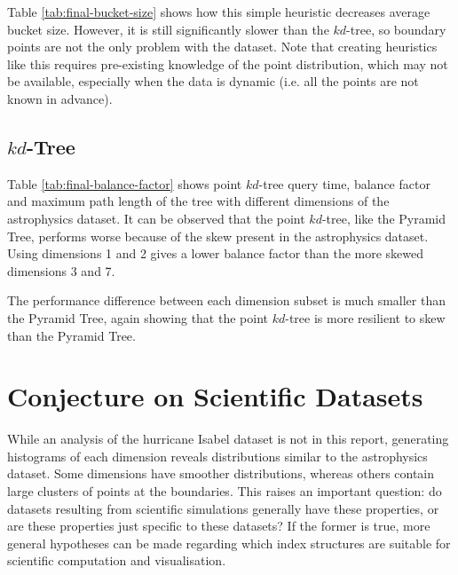 Table \ref{tab:final-bucket-size} shows how this simple heuristic decreases average bucket size. However, it is still significantly slower than the $kd$-tree, so boundary points are not the only problem with the dataset. Note that creating heuristics like this requires pre-existing knowledge of the point distribution, which may not be available, especially when the data is dynamic (i.e. all the points are not known in advance).

\subsection{$kd$-Tree}

Table \ref{tab:final-balance-factor} shows point $kd$-tree query time, balance factor and maximum path length of the tree with different dimensions of the astrophysics dataset. It can be observed that the point $kd$-tree, like the Pyramid Tree, performs worse because of the skew present in the astrophysics dataset. Using dimensions 1 and 2 gives a lower balance factor than the more skewed dimensions 3 and 7.

The performance difference between each dimension subset is much smaller than the Pyramid Tree, again showing that the point $kd$-tree is more resilient to skew than the Pyramid Tree.

\begin{table}
	\centering
	\caption{Point $kd$-tree Statistics with Different Dimensions of Astrophysics Dataset}
	\label{tab:final-balance-factor}
\end{table}

\section{Conjecture on Scientific Datasets}

While an analysis of the hurricane Isabel dataset is not in this report, generating histograms of each dimension reveals distributions similar to the astrophysics dataset. Some dimensions have smoother distributions, whereas others contain large clusters of points at the boundaries. This raises an important question: do datasets resulting from scientific simulations generally have these properties, or are these properties just specific to these datasets? If the former is true, more general hypotheses can be made regarding which index structures are suitable for scientific computation and visualisation.

